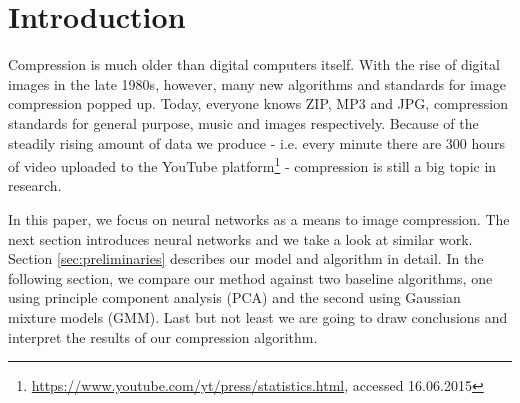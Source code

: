 
\section{Introduction} \label{sec:introduction}
 
Compression is much older than digital computers itself\cite{wolfram2002}. With the rise of digital images in the late 1980s, however, many new algorithms and standards for image compression popped up. Today, everyone knows ZIP, MP3 and JPG, compression standards for general purpose, music and images respectively. Because of the steadily rising amount of data we produce - i.e. every minute there are 300 hours of video uploaded to the YouTube platform\footnote{\url{https://www.youtube.com/yt/press/statistics.html}, accessed 16.06.2015} - compression is still a big topic in research.

In this paper, we focus on neural networks as a means to image compression. The next section introduces neural networks and we take a look at similar work. Section \ref{sec:preliminaries} describes our model and algorithm in detail. In the following section, we compare our method against two baseline algorithms, one using principle component analysis (PCA) and the second using Gaussian mixture models (GMM). Last but not least we are going to draw conclusions and interpret the results of our compression algorithm.

